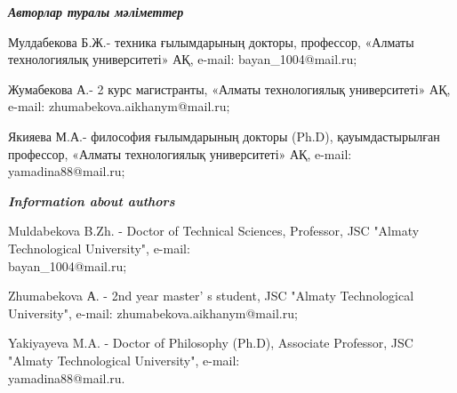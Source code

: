 \begin{authorinfo}
\emph{{\bfseries Авторлар туралы мәліметтер}}

Мулдабекова Б.Ж.- техника ғылымдарының докторы, профессор, «Алматы
технологиялық университеті» АҚ, e-mail: bayan\_1004@mail.ru;

Жумабекова А.- 2 курс магистранты, «Алматы технологиялық университеті»
АҚ, e-mail: zhumabekova.aikhanym@mail.ru;

Якияева М.А.- философия ғылымдарының докторы (Ph.D), қауымдастырылған
профессор, «Алматы технологиялық университеті» АҚ, e-mail:
yamadina88@mail.ru;

\emph{{\bfseries Information about authors}}

Muldabekova B.Zh. - Doctor of Technical Sciences, Professor, JSC "Almaty
Technological University", e-mail:\\
bayan\_1004@mail.ru;

Zhumabekova А. - 2nd year master' s student, JSC "Almaty
Technological University", e-mail:
zhumabekova.aikhanym@mail.ru;

Yakiyayeva M.A. - Doctor of Philosophy (Ph.D), Associate Professor, JSC
"Almaty Technological University", e-mail:\\
yamadina88@mail.ru.
\end{authorinfo}
